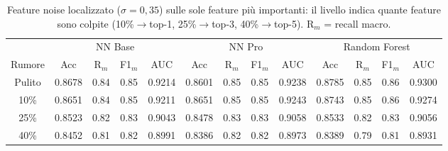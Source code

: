 \begin{table}[H]\centering\footnotesize
\setlength{\tabcolsep}{4pt}
\caption{Feature noise localizzato ($\sigma = 0{,}35$) sulle sole feature più importanti: il livello indica quante feature sono colpite (10\%$\to$top-1, 25\%$\to$top-3, 40\%$\to$top-5). R$_m$ = recall macro.}\label{tab:fnloc}
\begin{tabular}{c *{12}{c}}
\toprule
 & \multicolumn{4}{c}{NN Base} & \multicolumn{4}{c}{NN Pro} & \multicolumn{4}{c}{Random Forest}\\
\cmidrule(lr){2-5}\cmidrule(lr){6-9}\cmidrule(lr){10-13}
Rumore & Acc & R$_m$ & F1$_m$ & AUC & Acc & R$_m$ & F1$_m$ & AUC & Acc & R$_m$ & F1$_m$ & AUC \\
\midrule
Pulito & 0.8678 & 0.84 & 0.85 & 0.9214 & 0.8601 & 0.85 & 0.85 & 0.9238 & 0.8785 & 0.85 & 0.86 & 0.9300 \\
10\% & 0.8651 & 0.84 & 0.85 & 0.9211 & 0.8651 & 0.85 & 0.85 & 0.9243 & 0.8743 & 0.85 & 0.86 & 0.9274 \\
25\% & 0.8523 & 0.82 & 0.83 & 0.9043 & 0.8478 & 0.83 & 0.83 & 0.9058 & 0.8533 & 0.82 & 0.83 & 0.9056 \\
40\% & 0.8452 & 0.81 & 0.82 & 0.8991 & 0.8386 & 0.82 & 0.82 & 0.8973 & 0.8389 & 0.79 & 0.81 & 0.8931 \\
\bottomrule
\end{tabular}
\end{table}

